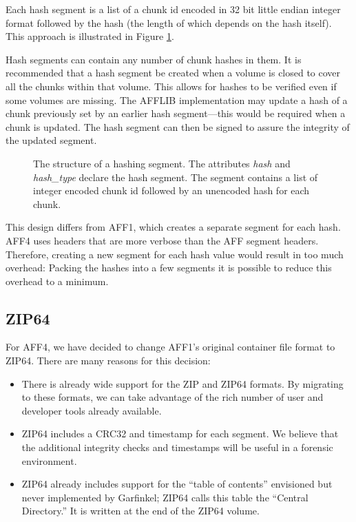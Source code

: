 \documentclass[10pt, conference]{IEEEtran}
\begin{document}
Each hash segment is a list of a chunk id encoded in 32 bit
little endian integer format followed by the hash (the length of which
depends on the hash itself). This approach is illustrated in Figure
\ref{hash_index}. 

Hash segments can contain any number of chunk hashes in them. It is
recommended that a hash segment be created when a volume is closed to
cover all the chunks within that volume. This allows for hashes to be
verified even if some volumes are missing. The AFFLIB implementation
may update a hash of a chunk previously set by an earlier hash
segment---this would be required when a chunk is updated. The hash
segment can then be signed to assure the integrity of the updated segment.

\begin{figure}[tb]
  \begin{center}
  \mbox{\columnwidth {}}
  \caption{The structure of a hashing segment. The attributes {\em
  hash} and {\em hash\_type} declare the hash segment. The segment
  contains a list of integer encoded chunk id followed by an unencoded
  hash for each chunk.}
  \label{hash_index}
  \end{center}
\end{figure}

This design differs from AFF1, which creates a separate segment for
each hash. AFF4 uses headers that are more verbose than the AFF
segment headers. Therefore, creating a new segment for each hash value
would result in too much overhead: Packing the hashes into a few
segments it is possible to reduce this overhead to a minimum.

\subsection{ZIP64}
For AFF4, we have decided to change AFF1's
original container file format to ZIP64\cite{zipspecs}. There are many
reasons for this decision:

\begin{itemize}
\item There is already wide support for the ZIP and ZIP64 formats. By
  migrating to these formats, we can take advantage of the rich number
  of user and developer tools already available.
\item ZIP64 includes a CRC32 and timestamp for each segment. We
  believe that the additional integrity checks and timestamps will be
  useful in a forensic environment.
\item ZIP64 already includes support for the ``table of contents''
  envisioned but never implemented by Garfinkel; ZIP64 calls this
  table the ``Central Directory.'' It is written at the end of the
  ZIP64 volume.
\end{itemize}
\end{document}
